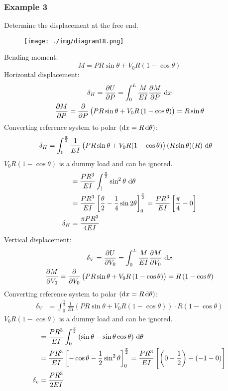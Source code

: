 \subsubsection{Example 3}
Determine the displacement at the free end.
\begin{figure}[H]
  \centering
  \texttt{[image: ./img/diagram18.png]}
  \caption{}
\end{figure}
Bending moment:
\begin{equation}
  M = PR \sin\theta + V_0 R\left(1-\cos\theta\right)
\end{equation}
Horizontal displacement:
\begin{gather}
  \delta_H = \frac{\partial U}{\partial P} = \int_0^L \frac{M}{EI} \frac{\partial M}{\partial P} \, \dif x\\
  \frac{\partial M}{\partial P} = \frac{\partial }{\partial P} \left(PR\sin\theta + V_0R \left(1-\cos\theta\right)\right) = R\sin\theta
\end{gather}
Converting reference system to polar $\left(\dif x = R \dif \theta\right)$:
\begin{align}
  \delta_H & = \int_0^{\frac{\pi}{2}} \frac{1}{EI} \left(PR\sin\theta + V_0R(1-\cos\theta)\right)(R\sin\theta)(R) \, \dif \theta
\end{align}
$V_0R(1-\cos\theta)$ is a dummy load and can be ignored.
\begin{align}
           & = \frac{PR^3}{EI} \int_)^{\frac{\pi}{2}} \sin^2\theta \, \dif \theta                                                                     \\
           & = \frac{PR^3}{EI} \left[\frac{\theta}{2}-\frac{1}{4}\sin{2\theta}\right]_0^{\frac{\pi}{2}} = \frac{PR^3}{EI}\left[\frac{\pi}{4}-0\right] \\
  \delta_H & = \frac{\pi PR^3}{4EI}
\end{align}
Vertical displacement:
\begin{gather}
  \delta_V = \frac{\partial U}{\partial V_0} = \int_0^L \frac{M}{EI} \frac{\partial M}{\partial V_0} \, \dif x\\
  \frac{\partial M}{\partial V_0} = \frac{\partial }{\partial V_0}\left(PR\sin\theta + V_0R\left(1-\cos\theta\right)\right) = R\left(1-\cos\theta\right)
\end{gather}
Converting reference system to polar $\left(\dif x = R \dif \theta\right)$:
\begin{align}
  \delta_V & = \int_0^{\frac{\pi}{2}} \frac{1}{EI} \left(PR\sin\theta + V_0R(1-\cos\theta)\right)\cdot R\left(1-\cos\theta\right)
\end{align}
$V_0R(1-\cos\theta)$ is a dummy load and can be ignored.
\begin{align}
           & = \frac{PR^3}{EI} \int_0^{\frac{\pi}{2}} \left(\sin\theta - \sin\theta\cos\theta\right)\, \dif \theta                                                             \\
           & = \frac{PR^3}{EI} \left[-\cos\theta - \frac{1}{2}\sin^2\theta\right]_0^{\frac{\pi}{2}} = \frac{PR^3}{EI}\left[\left(0-\frac{1}{2}\right)-\left(-1-0\right)\right] \\
  \delta_v & = \frac{PR^3}{2EI}
\end{align}
